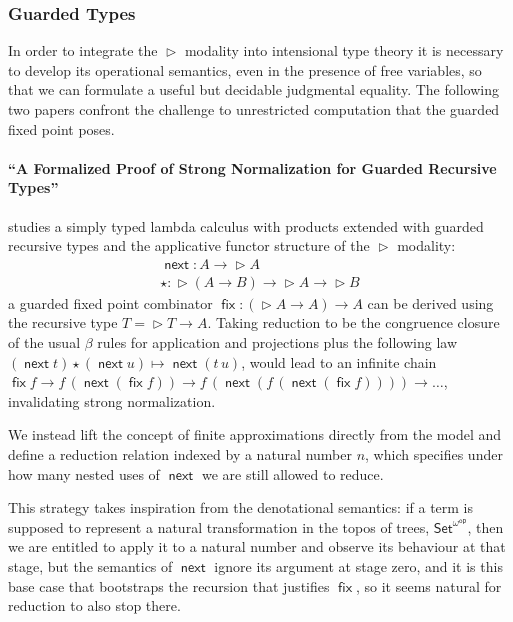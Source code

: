 \documentclass{book}
\DeclareMathOperator{\fix}{\mathsf{fix}}
\newcommand{\red}{\to}
\DeclareMathOperator{\Later}{\vartriangleright}
\DeclareMathOperator{\next}{\ensuremath{\mathsf{next}}}
\begin{document}

\subsubsection{Guarded Types}

In order to integrate the $\Later$ modality into intensional type
theory it is necessary to develop its operational semantics, even in
the presence of free variables, so that we can formulate a useful but
decidable judgmental equality. The following two papers confront the
challenge to unrestricted computation that the guarded fixed point
poses.

  \paragraph{``A Formalized Proof of Strong Normalization for Guarded Recursive Types''}
  studies a simply typed lambda calculus with products extended with guarded
  recursive types and the applicative functor structure of the $\Later$
  modality:
  \[
  \begin{array}{l}
  \next : A \to \Later A \\
  \star : \Later (A \to B) \to \Later A \to \Later B
  \end{array}
  \]
  a guarded fixed point combinator $\fix : (\Later A \to A) \to
  A$ can be derived using the recursive type $T = \Later T \to A$.
  Taking reduction to be the congruence closure of the usual $\beta$ rules
  for application and projections plus the following law $(\next t)
  \star (\next u) \mapsto \next (t\,u)$, would lead to an infinite
  chain $\fix f \red f\,(\next (\fix f)) \red f\,(\next (f\,(\next (\fix f)))) \red
  \ldots$, invalidating strong normalization.

  We instead lift the concept of finite approximations directly from
  the model and define a reduction relation indexed by a natural
  number $n$, which specifies under how many nested uses of $\next$ we
  are still allowed to reduce.

  This strategy takes inspiration from the denotational semantics: if
  a term is supposed to represent a natural transformation in the
  topos of trees, $\mathsf{Set}^{\omega^\mathsf{op}}$, then we are
  entitled to apply it to a natural number and observe its behaviour
  at that stage, but the semantics of $\next$ ignore its argument at
  stage zero, and it is this base case that bootstraps the recursion
  that justifies $\fix$, so it seems natural for reduction to also
  stop there.
\end{document}
